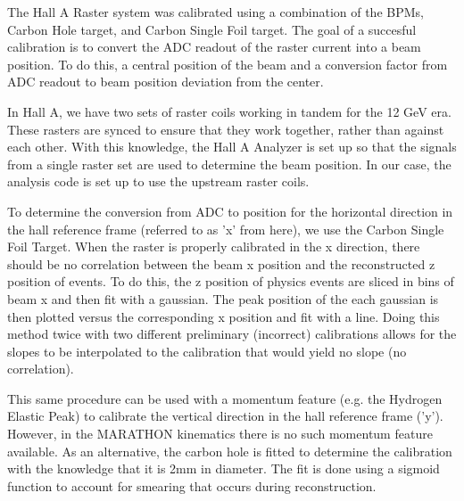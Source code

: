 The Hall A Raster system was calibrated using a combination of the BPMs, Carbon Hole target, and Carbon Single Foil target. The goal of a succesful calibration is to convert the ADC readout of the raster current into a beam position. To do this, a central position of the beam and a conversion factor from ADC readout to beam position deviation from the center.

In Hall A, we have two sets of raster coils working in tandem for the 12 GeV era. These rasters are synced to ensure that they work together, rather than against each other. With this knowledge, the Hall A Analyzer is set up so that the signals from a single raster set are used to determine the beam position. In our case, the analysis code is set up to use the upstream raster coils.

To determine the conversion from ADC to position for the horizontal direction in the hall reference frame (referred to as 'x' from here), we use the Carbon Single Foil Target. When the raster is properly calibrated in the x direction, there should be no correlation between the beam x position and the reconstructed z position of events. To do this, the z position of physics events are sliced in bins of beam x and then fit with a gaussian. The peak position of the each gaussian is then plotted versus the corresponding x position and fit with a line. Doing this method twice with two different preliminary (incorrect) calibrations allows for the slopes to be interpolated to the calibration that would yield no slope (no correlation).

This same procedure can be used with a momentum feature (e.g. the Hydrogen Elastic Peak) to calibrate the vertical direction in the hall reference frame ('y'). However, in the MARATHON kinematics there is no such momentum feature available. As an alternative, the carbon hole is fitted to determine the calibration with the knowledge that it is 2mm in diameter. The fit is done using a sigmoid function to account for smearing that occurs during reconstruction.
